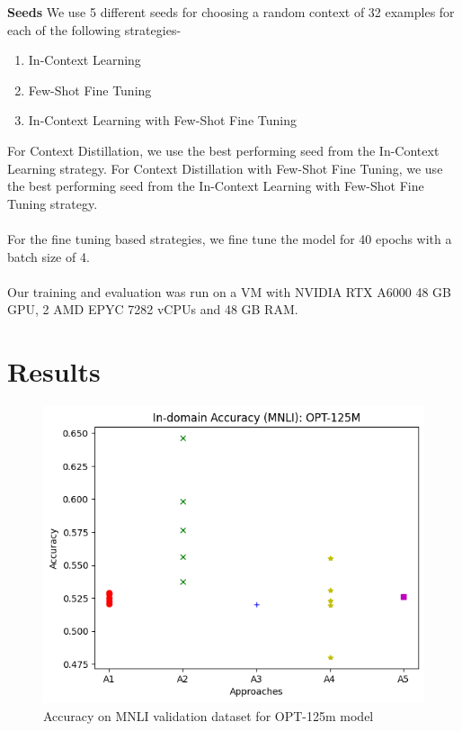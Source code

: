\documentclass[10pt,twocolumn,letterpaper]{article}
\begin{document}
\textbf{Seeds} We use 5 different seeds for choosing a random context of 32 examples for each of the following strategies-
\begin{enumerate}
    \item In-Context Learning
    \item Few-Shot Fine Tuning
    \item In-Context Learning with Few-Shot Fine Tuning
\end{enumerate}
For Context Distillation, we use the best performing seed from the In-Context Learning strategy. For Context Distillation with Few-Shot Fine Tuning, we use the best performing seed from the In-Context Learning with Few-Shot Fine Tuning strategy.\\\\

For the fine tuning based strategies, we fine tune the model for 40 epochs with a batch size of 4.\\\\
Our training and evaluation was run on a VM with NVIDIA RTX A6000 48 GB GPU, 2 AMD EPYC 7282 vCPUs and 48 GB RAM.


\section{Results}

\begin{figure}[h!]
\begin{center}
\includegraphics[width=0.8\linewidth]{figures/opt-125m-accuracy.png}
\end{center}
\caption{Accuracy on MNLI validation dataset for OPT-125m model}
\end{figure}
\end{document}
